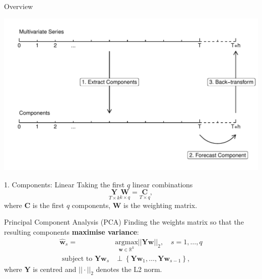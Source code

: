 \documentclass[14pt,ignorenonframetext,]{beamer}
\begin{document}
\begin{frame}{Overview}
\protect\hypertarget{overview-1}{}
\begin{center}
\includegraphics[width=\linewidth]{plot/p_timeline}
\end{center}
\end{frame}

\begin{frame}{1. Components: Linear}
\protect\hypertarget{components-linear}{}
Taking the first \(q\) linear combinations
\[\underset{T\times k}{\bm{Y}}\underset{k\times q}{\bm{W}}=\underset{T\times q}{\bm{C}},\]
where \(\bm{C}\) is the first \(q\) components, \(\bm{W}\) is the
weighting matrix.
\end{frame}

\begin{frame}
\begin{block}{Principal Component Analysis (PCA)}
\protect\hypertarget{principal-component-analysis-pca}{}
Finding the weights matrix so that the resulting components
\alert{\textbf{maximise variance}}: \[\begin{aligned}
\widehat{\bm{w}}_{s}=& \underset{\bm{w} \in \mathbb{R}^{k}}{\text{argmax} } ||\bm{Y}\bm{w}||_2, \quad s=1, \ldots, q \\
\text { subject to } \bm{Y}\bm{w}_{s}  & \perp\left\{\bm{Y} \bm{w}_{1}, \ldots, \bm{Y}\bm{w}_{s-1} \right\},
\end{aligned}\] where \(\bm{Y}\) is centred and \(||\cdot||_2\) denotes
the L2 norm.
\end{block}
\end{frame}
\end{document}
